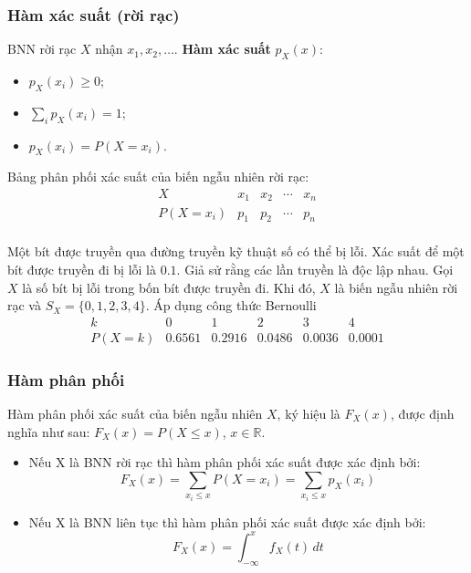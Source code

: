 \documentclass[12pt,a4paper]{article}
\begin{document}
\subsubsection{Hàm xác suất (rời rạc)}

\begin{dinhnghia}
  BNN rời rạc $X$ nhận $x_1, x_2, \ldots$. \textbf{Hàm xác suất} $p_X(x)$:
  \begin{itemize}
    \item $p_X(x_i) \ge 0$;
    \item $\displaystyle\sum_i p_X(x_i) = 1$;
    \item $p_X(x_i) = P(X = x_i)$.
  \end{itemize}
\end{dinhnghia}

\begin{dinhnghia}
  Bảng phân phối xác suất của biến ngẫu nhiên rời rạc:
  \[
    \begin{array}{c|ccccc}
      X & x_1 & x_2 & \cdots & x_n \\
      \hline
      P(X=x_i) & p_1 & p_2 & \cdots & p_n \\
    \end{array}
  \]
\end{dinhnghia}

\begin{vidu}[title={Số bít lỗi trong 4 bít}]
Một bít được truyền qua đường truyền kỹ thuật số có thể bị lỗi. Xác suất để một bít được truyền đi bị lỗi là $0.1$. Giả sử rằng các lần truyền là độc lập nhau. Gọi $X$ là số bít bị lỗi trong bốn bít được truyền đi. Khi đó, $X$ là biến ngẫu nhiên rời rạc và $S_X = \{0, 1, 2, 3, 4\}$. Áp dụng công thức Bernoulli
\[
\begin{array}{c|ccccc}
k & 0 & 1 & 2 & 3 & 4 \\
\hline
P(X=k) & 0.6561 & 0.2916 & 0.0486 & 0.0036 & 0.0001
\end{array}
\]
\end{vidu}

\subsubsection{Hàm phân phối}

\begin{dinhnghia}
Hàm phân phối xác suất của biến ngẫu nhiên $X$, ký hiệu là $F_X(x)$, được định nghĩa như sau: $F_X(x) = P(X \le x)$, $x \in \mathbb{R}$.
\begin{itemize}
\item Nếu X là BNN rời rạc thì hàm phân phối xác suất được xác định bởi:
\[
  F_X(x) = \displaystyle\sum_{x_i \le x} P(X = x_i) = \displaystyle\sum_{x_i \le x} p_X(x_i)
\]

\item Nếu X là BNN liên tục thì hàm phân phối xác suất được xác định bởi:
\[
  F_X(x) = \displaystyle\int_{-\infty}^{x} f_X(t)\,dt
\]
\end{itemize}
\end{dinhnghia}
\end{document}
